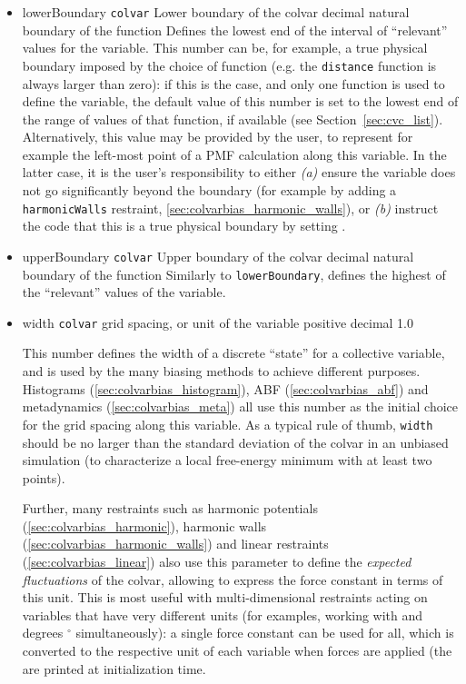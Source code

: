 \begin{itemize}

\item %
  \keydef
    {lowerBoundary}{%
    \texttt{colvar}}{%
    Lower boundary of the colvar}{%
    decimal}{%
    natural boundary of the function}{%
    Defines the lowest end of the interval of ``relevant'' values for the variable.
    This number can be, for example, a true physical boundary imposed by the choice of function (e.g.{} the \texttt{distance} function is always larger than zero): if this is the case, and only one function is used to define the variable, the default value of this number is set to the lowest end of the range of values of that function, if available (see Section~\ref{sec:cvc_list}).
    Alternatively, this value may be provided by the user, to represent for example the left-most point of a PMF calculation along this variable.
    In the latter case, it is the user's responsibility to either \emph{(a)} ensure the variable does not go significantly beyond the boundary (for example by adding a \texttt{harmonicWalls} restraint, \ref{sec:colvarbias_harmonic_walls}), or \emph{(b)} instruct the code that this is a true physical boundary by setting .
}

\item %
  \keydef
    {upperBoundary}{%
    \texttt{colvar}}{%
    Upper boundary of the colvar}{%
    decimal}{%
    natural boundary of the function}{%
    Similarly to \texttt{lowerBoundary}, defines the highest of the ``relevant'' values of the variable.}

\item %
  \keydef
    {width}{%
    \texttt{colvar}}{%
    grid spacing, or unit of the variable}{%
    positive decimal}{%
    1.0}{%
    This number defines the width of a discrete ``state'' for a collective variable, and is used by the many biasing methods to achieve different purposes.
    Histograms (\ref{sec:colvarbias_histogram}), ABF (\ref{sec:colvarbias_abf}) and metadynamics (\ref{sec:colvarbias_meta}) all use this number as the initial choice for the grid spacing along this variable.
    As a typical rule of thumb, \texttt{width} should be no larger than the standard deviation of the colvar in an unbiased simulation (to characterize a local free-energy minimum with at least two points).

    Further, many restraints such as harmonic potentials (\ref{sec:colvarbias_harmonic}), harmonic walls (\ref{sec:colvarbias_harmonic_walls}) and linear restraints (\ref{sec:colvarbias_linear}) also use this parameter to define the \emph{expected fluctuations} of the colvar, allowing to express the force constant in terms of this unit.
    This is most useful with multi-dimensional restraints acting on variables that have very different units (for examples, working with \lengthunit{} and degrees $^\circ$ simultaneously): a single force constant can be used for all, which is converted to the respective unit of each variable when forces are applied (the  are printed at initialization time.
  }


\end{itemize}
